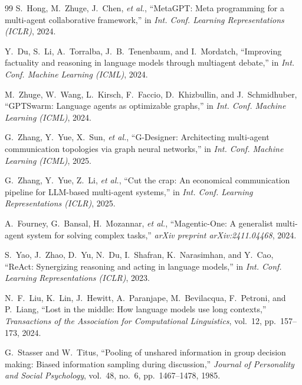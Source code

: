 \begin{thebibliography}{99}
S.~Hong, M.~Zhuge, J.~Chen, \emph{et al.},
``MetaGPT: Meta programming for a multi-agent collaborative framework,''
in \emph{Int. Conf. Learning Representations (ICLR)}, 2024.

Y.~Du, S.~Li, A.~Torralba, J.~B.~Tenenbaum, and I.~Mordatch,
``Improving factuality and reasoning in language models through multiagent debate,''
in \emph{Int. Conf. Machine Learning (ICML)}, 2024.

M.~Zhuge, W.~Wang, L.~Kirsch, F.~Faccio, D.~Khizbullin, and J.~Schmidhuber,
``GPTSwarm: Language agents as optimizable graphs,''
in \emph{Int. Conf. Machine Learning (ICML)}, 2024.

G.~Zhang, Y.~Yue, X.~Sun, \emph{et al.},
``G-Designer: Architecting multi-agent communication topologies via graph neural networks,''
in \emph{Int. Conf. Machine Learning (ICML)}, 2025.

G.~Zhang, Y.~Yue, Z.~Li, \emph{et al.},
``Cut the crap: An economical communication pipeline for LLM-based multi-agent systems,''
in \emph{Int. Conf. Learning Representations (ICLR)}, 2025.

A.~Fourney, G.~Bansal, H.~Mozannar, \emph{et al.},
``Magentic-One: A generalist multi-agent system for solving complex tasks,''
\emph{arXiv preprint arXiv:2411.04468}, 2024.

S.~Yao, J.~Zhao, D.~Yu, N.~Du, I.~Shafran, K.~Narasimhan, and Y.~Cao,
``ReAct: Synergizing reasoning and acting in language models,''
in \emph{Int. Conf. Learning Representations (ICLR)}, 2023.

N.~F.~Liu, K.~Lin, J.~Hewitt, A.~Paranjape, M.~Bevilacqua, F.~Petroni, and P.~Liang,
``Lost in the middle: How language models use long contexts,''
\emph{Transactions of the Association for Computational Linguistics}, vol.~12, pp.~157--173, 2024.

G.~Stasser and W.~Titus,
``Pooling of unshared information in group decision making: Biased information sampling during discussion,''
\emph{Journal of Personality and Social Psychology}, vol.~48, no.~6, pp.~1467--1478, 1985.

\end{thebibliography}
